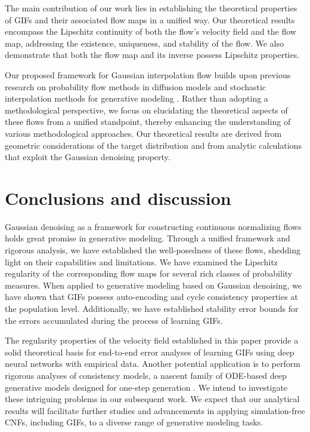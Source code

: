 \documentclass[twoside,11pt]{article}
\numberwithin{equation}{section}
\begin{document}
The main contribution of our work lies in establishing the theoretical properties of GIFs and their associated flow maps in a unified way. Our theoretical results encompass the Lipschitz continuity of both the flow's velocity field and the flow map, addressing the existence, uniqueness, and stability of the flow. We also demonstrate that both the flow map and its inverse possess Lipschitz properties.

Our proposed framework for Gaussian interpolation flow builds upon previous research on probability flow methods in diffusion models \citep{song2021scorebased, song2021denoising} and stochastic interpolation methods for generative modeling \citep{liu2023flow, albergo2023building, lipman2023flow}. Rather than adopting a methodological perspective, we focus on elucidating the theoretical aspects of these flows from a unified standpoint, thereby enhancing the understanding of various methodological approaches. Our theoretical results are derived from geometric considerations of the target distribution and from analytic calculations that exploit the Gaussian denoising property.

\section{Conclusions and discussion}

Gaussian denoising as a framework for constructing continuous normalizing flows holds great promise in generative modeling. Through a unified framework and rigorous analysis, we have established the well-posedness of these flows, shedding light on their capabilities and limitations. We have examined the Lipschitz regularity of the corresponding flow maps for several rich classes of probability measures. When applied to generative modeling based on Gaussian denoising, we have shown that GIFs possess auto-encoding and cycle consistency properties at the population level. Additionally, we have established stability error bounds for the errors accumulated during the process of learning GIFs.

The regularity properties of the velocity field established in this paper provide a solid theoretical basis for end-to-end error analyses of learning GIFs using deep neural networks with empirical data. Another potential application is to perform rigorous analyses of consistency models, a nascent family of ODE-based deep generative models designed for one-step generation \citep{song2023consistency, kim2023consistency, song2023improved}. We intend to investigate these intriguing problems in our subsequent work. We expect that our analytical results will facilitate further studies and advancements in applying simulation-free CNFs, including GIFs, to a diverse range of generative modeling tasks.
\end{document}
